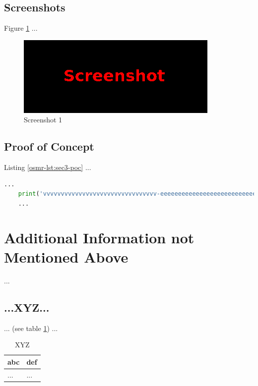\subsection{Screenshots}\label{osmr-sec:sec3-screens}
%
Figure \ref{osmr-fig:sec3-screen1} ...

\begin{figure}[H]
    \centering
    \includegraphics[width=\textwidth]{img/assignment1/screen1.png}
    \caption{Screenshot 1}\label{osmr-fig:sec3-screen1}
\end{figure}
%
%
%
\subsection{Proof of Concept}\label{osmr-sec:sec3-poc}
%
Listing \ref{osmr-lst:sec3-poc} ...\\

\begin{lstlisting}[language=Python,caption={Proof of Concept}, label={osmr-lst:sec3-poc}]
    ...
    print('vvvvvvvvvvvvvvvvvvvvvvvvvvvvvvvv-eeeeeeeeeeeeeeeeeeeeeeeeeeeeeeeeeeeeeeeeeee-looooooooooooooooooooooong-striiiiiiiiiiiiiing')
    ...
\end{lstlisting}
%
%
%
\section{Additional Information not Mentioned Above}\label{osmr-sec:last}
%
...
%
%
%
\subsection{...XYZ...}\label{osmr-sec:last-xyz}
%
... (see table \ref{osmr-tbl:last-xyz}) ...

\begin{table}[H]
    \begin{tabularx}{\textwidth}{l|l}
        \textbf{abc} & \textbf{def} \\
        \hline
        ... & ...\\
    \end{tabularx}
    \caption{XYZ\label{osmr-tbl:last-xyz}}
\end{table}
%
%
%
